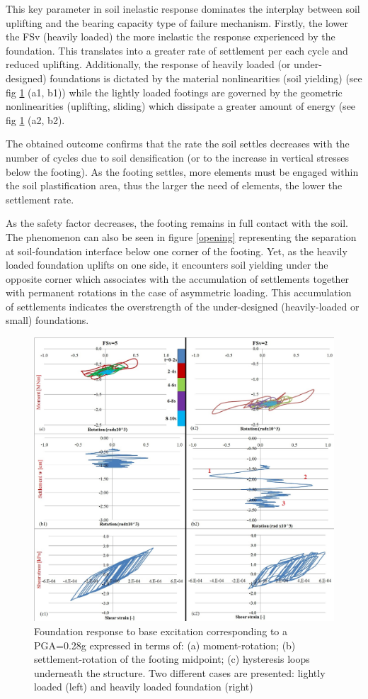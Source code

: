  This key parameter in soil inelastic response dominates the interplay between soil uplifting and the bearing capacity type of failure mechanism. Firstly, the lower the FSv (heavily loaded) the more inelastic the response experienced by the foundation. This translates into a greater rate of settlement per each cycle and reduced uplifting. Additionally, the response of heavily loaded (or under-designed) foundations is dictated by the material nonlinearities (soil yielding) (see fig \ref{eq1} (a1, b1)) while the lightly loaded footings are governed by the geometric nonlinearities (uplifting, sliding) which dissipate a greater amount of energy (see fig \ref{eq1} (a2, b2).
 
 The obtained outcome confirms that the rate the soil settles decreases with the number of cycles due to soil densification (or to the increase in vertical stresses below the footing). As the footing settles, more elements must be engaged within the soil plastification area, thus the larger the need of elements, the lower the settlement rate. 
 
 As the safety factor decreases, the footing remains in full contact with the soil. The phenomenon can also be seen in figure \ref{opening} representing the separation at soil-foundation interface below one corner of the footing. Yet, as the heavily loaded foundation uplifts on one side, it encounters soil yielding under the opposite corner which associates with the accumulation of settlements together with permanent rotations in the case of asymmetric loading. This accumulation of settlements indicates the overstrength of the under-designed (heavily-loaded or small) foundations.
 
  \begin{figure}[!h]
  	\centering
  	\includegraphics[width=0.95\linewidth]{"eq_fs5-24m"}
  	\caption{Foundation response to base excitation corresponding to a PGA=0.28g expressed in terms of: (a) moment-rotation; (b) settlement-rotation of the footing midpoint; (c) hysteresis loops underneath the structure. Two different cases are presented: lightly loaded (left) and heavily loaded foundation (right)}
  	\label{eq1}
  \end{figure}
  
